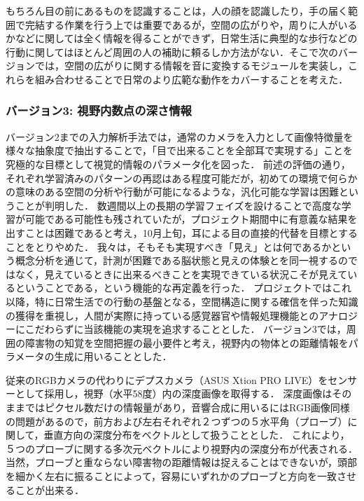 もちろん目の前にあるものを認識することは，人の顔を認識したり，手の届く範囲で完結する作業を行う上では重要であるが，空間の広がりや，周りに人がいるかなどに関しては全く情報を得ることができず，日常生活に典型的な歩行などの行動に関してはほとんど周囲の人の補助に頼るしか方法がない．そこで次のバージョンでは，空間の広がりに関する情報を音に変換するモジュールを実装し，これらを組み合わせることで日常のより広範な動作をカバーすることを考えた．

\subsubsection{バージョン3: 視野内数点の深さ情報}

バージョン2までの入力解析手法では，通常のカメラを入力として画像特徴量を様々な抽象度で抽出することで，「目で出来ることを全部耳で実現する」ことを究極的な目標として視覚的情報のパラメータ化を図った．
前述の評価の通り，それぞれ学習済みのパターンの再認はある程度可能だが，初めての環境で何らかの意味のある空間の分析や行動が可能になるような，汎化可能な学習は困難ということが判明した．
数週間以上の長期の学習フェイズを設けることで高度な学習が可能である可能性も残されていたが，プロジェクト期間中に有意義な結果を出すことは困難であると考え，10月上旬，耳による目の直接的代替を目標とすることをとりやめた．
我々は，そもそも実現すべき「見え」とは何であるかという概念分析を通じて，計測が困難である脳状態と見えの体験とを同一視するのではなく，見えているときに出来るべきことを実現できている状況こそが見えているということである，という機能的な再定義を行った．
プロジェクトではこれ以降，特に日常生活での行動の基盤となる，空間構造に関する確信を伴った知識の獲得を重視し，人間が実際に持っている感覚器官や情報処理機能とのアナロジーにこだわらずに当該機能の実現を追求することとした．
バージョン3では，周囲の障害物の知覚を空間把握の最小要件と考え，視野内の物体との距離情報をパラメータの生成に用いることとした．

従来のRGBカメラの代わりにデプスカメラ（ASUS Xtion PRO LIVE）をセンサーとして採用し，視野（水平58度）内の深度画像を取得する．
深度画像はそのままではピクセル数だけの情報量があり，音響合成に用いるにはRGB画像同様の問題があるので，前方および左右それぞれ２つずつの５水平角（プローブ）に関して，垂直方向の深度分布をベクトルとして扱うこととした．
これにより，５つのプローブに関する多次元ベクトルにより視野内の深度分布が代表される．
当然，プローブと重ならない障害物の距離情報は捉えることはできないが，頭部を細かく左右に振ることによって，容易にいずれかのプローブと方向を一致させることが出来る．


